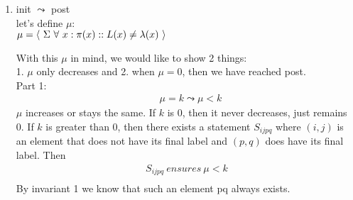 \documentclass{article}
\begin{document}
\begin{enumerate}


\item
init $\leadsto$ post\\
let's define $\mu$:\\
$\mu = \langle \ \Sigma \ \forall \ x : \pi(x) :: L(x) \neq \lambda(x) \ \rangle\\$

With this $\mu$ in mind, we would like to show 2 things:\\
1. $\mu$ only decreases and 2. when $\mu=0$, then we have reached post.\\

Part 1:\\
\begin{align*}
&\mu = k \leadsto \mu < k
\end{align*}
$\mu$ increases or stays the same. If $k$ is 0, then it never decreases, just remains 0. If $k$ is greater than 0, then there exists a statement $S_{ijpq}$ where $(i,j)$ is an element that does not have its final label and $(p,q)$ does have its final label. Then\\
\begin{align*}
S_{ijpq} \ ensures \ \mu < k\\
\end{align*}
By invariant 1 we know that such an element pq always exists.\\

\iffalse
\begin{align*}
&\emph{Let's say that:}\\
&\pi(x)=(i,j) \wedge L(x)\neq \lambda(x) \wedge \pi(y)=(p,q) \wedge L(y)=\lambda(y)\\
&\emph{then}\\
&L(i,j) := min(L(i,j),L(p,q)) \ if \ SameRegion((i,j),(p,q)) \ ensures \ L(x)=\lambda(x)\\
&\emph{and}\\
&\langle \forall x \ : \pi(x)=(i,j) \ :: \exists \ i,j : 0 \leq i,j \leq N :: L(x)=\lambda(x) \ \rangle\\
\end{align*}
meaning that if x does not have its final label and y does have its final label, then we can select the assignment statement that takes x and y, and this statement ensures that $\mu$ decreases.\\
Additionally, there always exists such a $y$ that $L(y)=\lambda(y)$, because at least one element is set to the minimum label in its region.\\
\fi


\end{enumerate}
\end{document}
